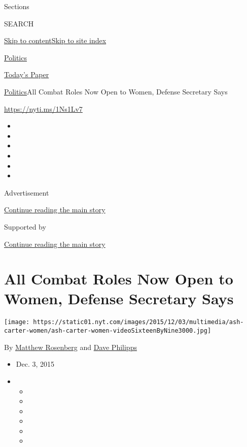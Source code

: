 Sections

SEARCH

\protect\hyperlink{site-content}{Skip to
content}\protect\hyperlink{site-index}{Skip to site index}

\href{https://www.nytimes.com/section/politics}{Politics}

\href{https://myaccount.nytimes.com/auth/login?response_type=cookie\&client_id=vi}{}

\href{https://www.nytimes.com/section/todayspaper}{Today's Paper}

\href{/section/politics}{Politics}\textbar{}All Combat Roles Now Open to
Women, Defense Secretary Says

\url{https://nyti.ms/1Ns1Lv7}

\begin{itemize}
\item
\item
\item
\item
\item
\item
\end{itemize}

Advertisement

\protect\hyperlink{after-top}{Continue reading the main story}

Supported by

\protect\hyperlink{after-sponsor}{Continue reading the main story}

\hypertarget{all-combat-roles-now-open-to-women-defense-secretary-says}{%
\section{All Combat Roles Now Open to Women, Defense Secretary
Says}\label{all-combat-roles-now-open-to-women-defense-secretary-says}}

\texttt{[image: https://static01.nyt.com/images/2015/12/03/multimedia/ash-carter-women/ash-carter-women-videoSixteenByNine3000.jpg]}

By \href{http://www.nytimes.com/by/matthew-rosenberg}{Matthew Rosenberg}
and \href{http://www.nytimes.com/by/dave-philipps}{Dave Philipps}

\begin{itemize}
\item
  Dec. 3, 2015
\item
  \begin{itemize}
  \item
  \item
  \item
  \item
  \item
  \item
  \end{itemize}
\end{itemize}

